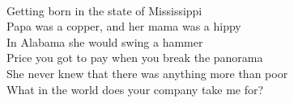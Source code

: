 \\
Getting born in the state of Mississippi \\
Papa was a copper, and her mama was a hippy \\
In Alabama she would swing a hammer \\
Price you got to pay when you break the panorama \\
She never knew that there was anything more than poor \\
What in the world does your company take me for?
